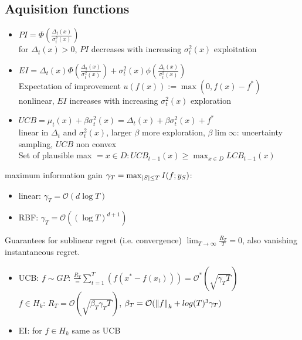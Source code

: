 \subsection{Aquisition functions}
\begin{itemize}
    \item $PI = \Phi(\frac{\Delta_{t}(x)}{\sigma_{t}^{2}(x)})$\\
    for $\Delta_{t}(x) >0$, $PI$ decreases with increasing $\sigma_{t}^{2}(x)$ \textrightarrow exploitation
    \item $EI = \Delta_{t}(x)\Phi(\frac{\Delta_{t}(x)}{\sigma_{t}^{2}(x)}) +
    \sigma_{t}^{2}(x) \phi(\frac{\Delta_{t}(x)}{\sigma_{t}^{2}(x)})$\\
    Expectation of improvement $u(f(x)):= \max(0, f(x)-f^{*})$\\
    nonlinear, $EI$ increases with increasing $\sigma_{t}^{2}(x)$ \textrightarrow exploration
    \item $UCB = \mu_{t}(x) + \beta \sigma_{t}^{2}(x) = \Delta_{t}(x) + \beta \sigma_{t}^{2}(x) + f^{*}$\\
    linear in $\Delta_{t}$ and $\sigma_{t}^{2}(x)$, larger $\beta$ \textrightarrow more exploration,
    $\beta \lim \infty$: uncertainty sampling, $UCB$ non convex\\
    Set of plausible max $={x \in D: UCB_{t-1}(x) \geq \max_{x \in D} LCB_{t-1}(x)}$
\end{itemize}

maximum information gain $\gamma_{T} = \max_{\left\lvert S\right\rvert \leq T} I(f;y_{S})$:
\begin{itemize}
    \item linear: $\gamma_{T} = \mathcal{O}(d \log T)$
    \item RBF: $\gamma_{T} = \mathcal{O}((\log T)^{d+1})$
\end{itemize}
Guarantees for sublinear regret (i.e. convergence) \textrightarrow $\lim_{T \rightarrow \infty} \frac{R_{T}}{T} =0$,
also vanishing instantaneous regret.
\begin{itemize}
    \item UCB:
    $f \sim GP$: $\frac{R_{T}} = \sum_{t=1}^{T}(f(x^{*}-f(x_{t}))) = \mathcal{O}^{*}(\sqrt {\gamma_{T}T})$\\
    $f \in H_{k}$: $R_{T} = \mathcal{O}(\sqrt {\beta_{T}\gamma_{T}T})$,
    $\beta_{T} = \mathcal{O}(\left\lVert f\right\rVert_{k} + log(T)^{3}\gamma_{T})$
    \item EI: for $f \in H_{k}$ same as UCB
\end{itemize}




